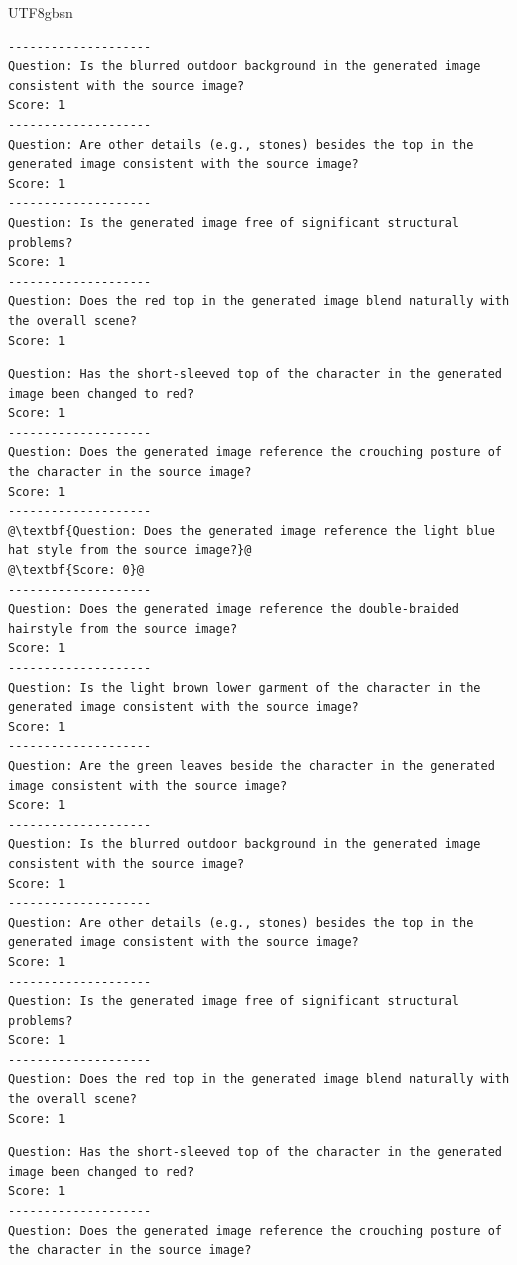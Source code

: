 \documentclass{llmxive}
\begin{document}
\begin{CJK*}{UTF8}{gbsn}
\begin{lstlisting}[style=promptstyle, caption={RRM verification for the SFT model's "winner" output.}, label=lst:sft_winner_verification, escapechar=@]
--------------------
Question: Is the blurred outdoor background in the generated image consistent with the source image?
Score: 1
--------------------
Question: Are other details (e.g., stones) besides the top in the generated image consistent with the source image?
Score: 1
--------------------
Question: Is the generated image free of significant structural problems?
Score: 1
--------------------
Question: Does the red top in the generated image blend naturally with the overall scene?
Score: 1
\end{lstlisting}
\begin{lstlisting}[style=promptstyle, caption={RRM verification for the RL-tuned model's "loser" output. The model still fails on this specific point.}, label=lst:rl_loser_verification, escapechar=@]
Question: Has the short-sleeved top of the character in the generated image been changed to red?
Score: 1
--------------------
Question: Does the generated image reference the crouching posture of the character in the source image?
Score: 1
--------------------
@\textbf{Question: Does the generated image reference the light blue hat style from the source image?}@
@\textbf{Score: 0}@
--------------------
Question: Does the generated image reference the double-braided hairstyle from the source image?
Score: 1
--------------------
Question: Is the light brown lower garment of the character in the generated image consistent with the source image?
Score: 1
--------------------
Question: Are the green leaves beside the character in the generated image consistent with the source image?
Score: 1
--------------------
Question: Is the blurred outdoor background in the generated image consistent with the source image?
Score: 1
--------------------
Question: Are other details (e.g., stones) besides the top in the generated image consistent with the source image?
Score: 1
--------------------
Question: Is the generated image free of significant structural problems?
Score: 1
--------------------
Question: Does the red top in the generated image blend naturally with the overall scene?
Score: 1
\end{lstlisting}
\begin{lstlisting}[style=promptstyle, caption={RRM verification for the RL-tuned model's "winner" output. It confirms the model has learned to preserve the hat style correctly.}, label=lst:rl_winner_verification, escapechar=@]
Question: Has the short-sleeved top of the character in the generated image been changed to red?
Score: 1
--------------------
Question: Does the generated image reference the crouching posture of the character in the source image?

\end{lstlisting}
\end{CJK*}
\end{document}
